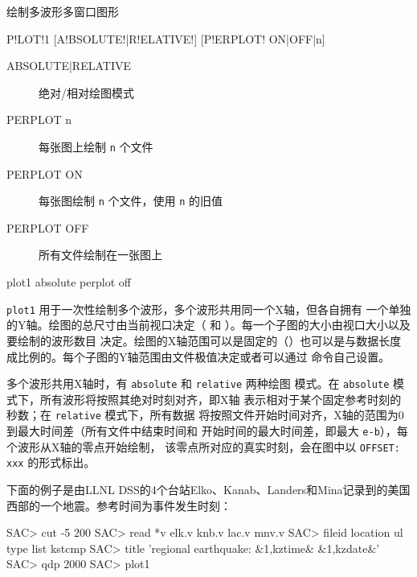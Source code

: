 \label{cmd:plot1}

绘制多波形多窗口图形

\begin{SACSTX}
P!LOT!1 [A!BSOLUTE!|R!ELATIVE!] [P!ERPLOT! ON|OFF|n]
\end{SACSTX}

\begin{description}
\item [ABSOLUTE|RELATIVE] 绝对/相对绘图模式
\item [PERPLOT n] 每张图上绘制 \texttt{n} 个文件
\item [PERPLOT ON] 每张图绘制 \texttt{n} 个文件，使用 \texttt{n} 的旧值
\item [PERPLOT OFF] 所有文件绘制在一张图上
\end{description}

\begin{SACDFT}
plot1 absolute perplot off
\end{SACDFT}

\texttt{plot1} 用于一次性绘制多个波形，多个波形共用同一个X轴，但各自拥有
一个单独的Y轴。绘图的总尺寸由当前视口决定（ 和
）。每一个子图的大小由视口大小以及要绘制的波形数目
决定。绘图的X轴范围可以是固定的（）也可以是与数据长度
成比例的。每个子图的Y轴范围由文件极值决定或者可以通过 
命令自己设置。

多个波形共用X轴时，有 \texttt{absolute} 和 \texttt{relative} 两种绘图
模式。在 \texttt{absolute} 模式下，所有波形将按照其绝对时刻对齐，即X轴
表示相对于某个固定参考时刻的秒数；在 \texttt{relative} 模式下，所有数据
将按照文件开始时间对齐，X轴的范围为0到最大时间差（所有文件中结束时间和
开始时间的最大时间差，即最大 \texttt{e-b}），每个波形从X轴的零点开始绘制，
该零点所对应的真实时刻，会在图中以 \texttt{OFFSET: xxx} 的形式标出。

下面的例子是由LLNL DSS的4个台站Elko、Kanab、Landers和Mina记录到的美国
西部的一个地震。参考时间为事件发生时刻：
\begin{SACCode}
SAC> cut -5 200
SAC> read *v
 elk.v knb.v lac.v mnv.v
SAC> fileid location ul type list kstcmp
SAC> title 'regional earthquake:  &1,kztime&  &1,kzdate&'
SAC> qdp 2000
SAC> plot1
\end{SACCode}
